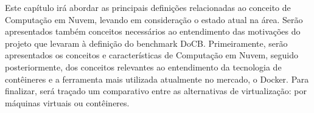 \documentclass[twoside,english,brazilian]{UNISINOSartigo}
\begin{document}

Este capítulo irá abordar as principais definições relacionadas ao conceito de Computação em Nuvem, levando em consideração o estado atual na área. Serão apresentados também conceitos necessários ao entendimento das motivações do projeto que levaram à definição do benchmark DoCB. Primeiramente, serão apresentados os conceitos e características de Computação em Nuvem, seguido posteriormente, dos conceitos relevantes ao entendimento da tecnologia de contêineres e a ferramenta mais utilizada atualmente no mercado, o Docker. Para finalizar, será traçado um comparativo entre as alternativas de virtualização: por máquinas virtuais ou contêineres. 
\end{document}
